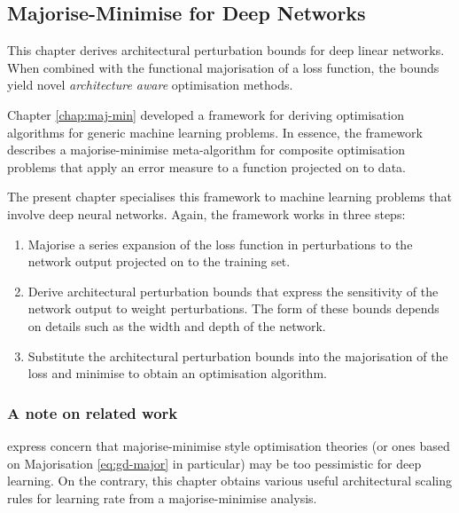 \begin{refsection}

\chapter{Majorise-Minimise for Deep Networks}
\label{chap:nn-maj-min}

\begin{tcolorbox}
This chapter derives architectural perturbation bounds for deep linear networks. When combined with the functional majorisation of a loss function, the bounds yield novel \textit{architecture aware} optimisation methods.
\end{tcolorbox}

Chapter \ref{chap:maj-min} developed a framework for deriving optimisation algorithms for generic machine learning problems. In essence, the framework describes a majorise-minimise meta-algorithm \citep{mm} for composite optimisation problems that apply an error measure to a function projected on to data.

The present chapter specialises this framework to machine learning problems that involve deep neural networks. Again, the framework works in three steps:

\begin{enumerate}[label=Step \arabic*:, leftmargin=*, font=\sffamily]
    \item Majorise a series expansion of the loss function in perturbations to the network output projected on to the training set.
    \item Derive architectural perturbation bounds that express the sensitivity of the network output to weight perturbations. The form of these bounds depends on details such as the width and depth of the network.
    \item Substitute the architectural perturbation bounds into the majorisation of the loss and minimise to obtain an optimisation algorithm.
\end{enumerate}

\subsection{A note on related work}

\citet{cohen2021gradient} express concern that majorise-minimise style optimisation theories (or ones based on Majorisation \ref{eq:gd-major} in particular) may be too pessimistic for deep learning. On the contrary, this chapter obtains various useful architectural scaling rules for learning rate from a majorise-minimise analysis.


\end{refsection}
